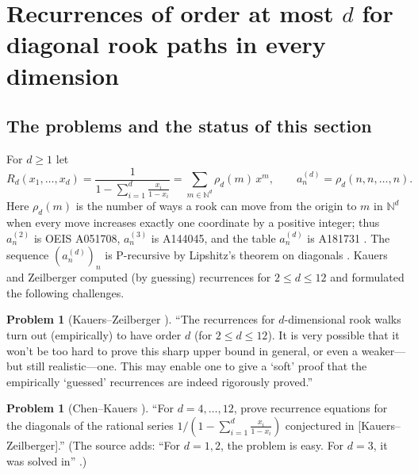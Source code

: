 \documentclass[11pt]{amsart}
\theoremstyle{definition}
\newtheorem{problem}[theorem]{Problem}
\theoremstyle{remark}
\begin{document}
\providecommand{\Rone}{\mathrm{R1}}
\providecommand{\RoneJ}{\mathcal{J}}
\providecommand{\RoneN}{\mathbb{N}}
\providecommand{\RoneQ}{\mathbb{Q}}
\providecommand{\RoneC}{\mathbb{C}}
\providecommand{\texorpdfstring}[2]{#1}

\section{Recurrences of order at most \texorpdfstring{$d$}{d} for diagonal rook paths in every dimension}\label{R1:sec}

\subsection{The problems and the status of this section}\label{R1:sec:problems}

For $d\ge1$ let
\[
R_d(x_1,\dots,x_d)=\frac{1}{1-\sum_{i=1}^{d}\frac{x_i}{1-x_i}}
=\sum_{m\in\RoneN^d}\rho_d(m)\,x^m ,
\qquad a^{(d)}_n=\rho_d(n,n,\dots,n).
\]
Here $\rho_d(m)$ is the number of ways a rook can move from the origin to $m$ in
$\RoneN^d$ when every move increases exactly one coordinate by a positive integer; thus
$a^{(2)}_n$ is OEIS A051708, $a^{(3)}_n$ is A144045, and the table $a^{(d)}_n$ is A181731
\cite{R1-OEIS}.
The sequence $(a^{(d)}_n)_n$ is P-recursive by Lipshitz's theorem on diagonals
\cite{R1-Lipshitz}. Kauers and Zeilberger computed (by guessing) recurrences for
$2\le d\le 12$ and formulated the following challenges.

\begin{problem}[{Kauers--Zeilberger \cite[\S2]{R1-KZ}}]\label{R1:prob:KZ}
``The recurrences for $d$-dimensional rook walks turn out (empirically) to have order $d$
(for $2\le d\le 12$). It is very possible that it won't be too hard to prove this sharp
upper bound in general, or even a weaker---but still realistic---one. This may enable one to
give a `soft' proof that the empirically `guessed' recurrences are indeed rigorously proved.''
\end{problem}

\begin{problem}[{Chen--Kauers \cite[Problem 17]{R1-CK}}]\label{R1:prob:CK}
``For $d=4,\dots,12$, prove recurrence equations for the diagonals of the rational series
$1/(1-\sum_{i=1}^{d}\frac{x_i}{1-x_i})$ conjectured in [Kauers--Zeilberger].''
(The source adds: ``For $d=1,2$, the problem is easy. For $d=3$, it was solved in''
\cite{R1-BCvHP}.)
\end{problem}
\end{document}
